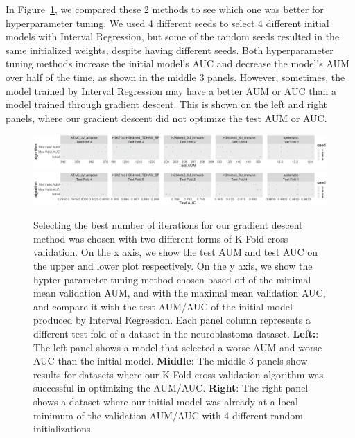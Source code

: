 \documentclass{article}
\begin{document}
In Figure~\ref{fig:test-aum-comparison}, we compared these 2 methods to see which one was better for hyperparameter tuning. 
We used 4 different seeds to select 4 different initial models with Interval Regression, but some of the random seeds resulted in the same initialized weights, despite having different seeds.
Both hyperparameter tuning methods increase the initial model's AUC and decrease the model's AUM over half of the time, as shown in the middle 3 panels. 
However, sometimes, the model trained by Interval Regression may have a better AUM or AUC than a model trained through gradient descent. This is shown on the left and right panels, where our gradient descent did not optimize the test AUM or AUC.










\begin{figure}[ht]
\vskip 0.2in
\begin{center}
\includegraphics[width=\textwidth]{figure-test-aum-comparison.png}
\includegraphics[width=\textwidth]{figure-test-auc-comparison.png}
\vskip -0.5cm
\caption{
Selecting the best number of iterations for our gradient descent method was chosen with two different forms of K-Fold cross validation. 
On the x axis, we show the test AUM and test AUC on the upper and lower plot respectively.
On the y axis, we show the hypter parameter tuning method chosen based off of the minimal mean validation AUM, and with the maximal mean validation AUC, and compare it with the test AUM/AUC of the initial model produced by Interval Regression. 
Each panel column represents a different test fold of a dataset in the neuroblastoma dataset. 
\textbf{Left:}: The left panel shows a model that selected a worse AUM and worse AUC than the initial model. 
\textbf{Middle}: The middle 3 panels show results for datasets where our K-Fold cross validation algorithm was successful in optimizing the AUM/AUC. 
\textbf{Right}: The right panel shows a dataset where our initial model was already at a local minimum of the validation AUM/AUC with 4 different random initializations.}
\label{fig:test-aum-comparison}
\end{center}
\vskip -0.2in
\end{figure}
\end{document}
